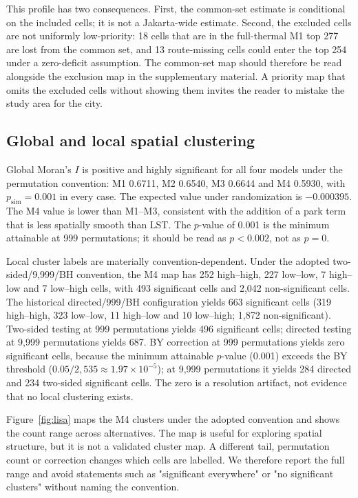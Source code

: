 \documentclass[times,twoside]{_Templates/MultiTargetManuscript}
\begin{document}
This profile has two consequences. First, the common-set estimate is conditional
on the included cells; it is not a Jakarta-wide estimate. Second, the excluded
cells are not uniformly low-priority: 18 cells that are in the full-thermal M1
top 277 are lost from the common set, and 13 route-missing cells could enter the
top 254 under a zero-deficit assumption. The common-set map should therefore be
read alongside the exclusion map in the supplementary material. A priority map
that omits the excluded cells without showing them invites the reader to mistake
the study area for the city.



\subsection{Global and local spatial clustering}

Global Moran's $I$ is positive and highly significant for all four models under
the permutation convention: M1 0.6711, M2 0.6540, M3 0.6644 and M4 0.5930, with
$p_{\mathrm{sim}}=0.001$ in every case. The expected value under randomization is
$-0.000395$. The M4 value is lower than M1--M3, consistent with the addition of a
park term that is less spatially smooth than LST. The $p$-value of 0.001 is the
minimum attainable at 999 permutations; it should be read as $p<0.002$, not as
$p=0$.

Local cluster labels are materially convention-dependent. Under the adopted
two-sided/9,999/BH convention, the M4 map has 252 high--high, 227 low--low, 7
high--low and 7 low--high cells, with 493 significant cells and 2,042
non-significant cells. The historical directed/999/BH configuration yields 663
significant cells (319 high--high, 323 low--low, 11 high--low and 10 low--high;
1,872 non-significant). Two-sided testing at 999 permutations yields 496
significant cells; directed testing at 9,999 permutations yields 687. BY
correction at 999 permutations yields zero significant cells, because the
minimum attainable $p$-value (0.001) exceeds the BY threshold
($0.05/2{,}535\approx1.97\times10^{-5}$); at 9,999 permutations it yields 284
directed and 234 two-sided significant cells. The zero is a resolution artifact,
not evidence that no local clustering exists.

Figure~\ref{fig:lisa} maps the M4 clusters under the adopted convention and
shows the count range across alternatives. The map is useful for exploring
spatial structure, but it is not a validated cluster map. A different tail,
permutation count or correction changes which cells are labelled. We therefore
report the full range and avoid statements such as "significant everywhere" or
"no significant clusters" without naming the convention.
\end{document}
